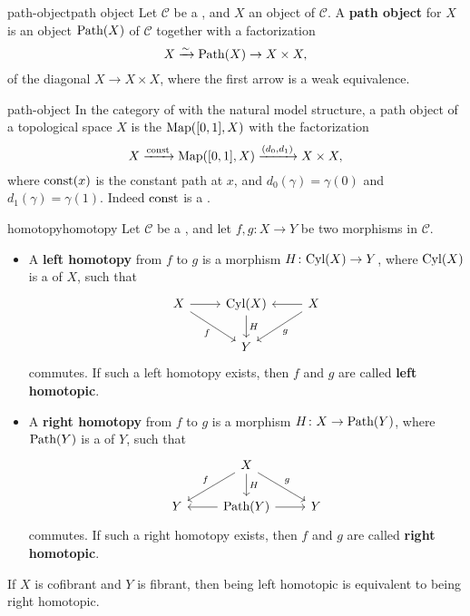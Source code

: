 \begin{topic}{path-object}{path object}
    Let $\mathcal{C}$ be a , and $X$ an object of $\mathcal{C}$. A \textbf{path object} for $X$ is an object $\textup{Path}(X)$ of $\mathcal{C}$ together with a factorization
    \[ X \xrightarrow{\sim} \textup{Path}(X) \to X \times X , \]
    of the diagonal $X \to X \times X$, where the first arrow is a weak equivalence.
\end{topic}

\begin{example}{path-object}
    In the category of  with the natural model structure, a path object of a topological space $X$ is the  $\textup{Map}([0, 1], X)$ with the factorization
    \[ X \xrightarrow{\textup{const}} \textup{Map}([0, 1], X) \xrightarrow{(d_0, d_1)} X \times X , \]
    where $\textup{const}(x)$ is the constant path at $x$, and $d_0(\gamma) = \gamma(0)$ and $d_1(\gamma) = \gamma(1)$. Indeed $\textup{const}$ is a .
\end{example}

\begin{topic}{homotopy}{homotopy}
    Let $\mathcal{C}$ be a , and let $f, g \colon X \to Y$ be two morphisms in $\mathcal{C}$.
    \begin{itemize}
        \item A \textbf{left homotopy} from $f$ to $g$ is a morphism $H \colon \textup{Cyl}(X) \to Y$, where $\textup{Cyl}(X)$ is a  of $X$, such that
        \[ \svg \begin{tikzcd} X \arrow{r} \arrow[swap]{dr}{f} & \textup{Cyl}(X) \arrow{d}{H} & X \arrow{l} \arrow{ld}{g} \\ & Y & \end{tikzcd} \]
        commutes. If such a left homotopy exists, then $f$ and $g$ are called \textbf{left homotopic}.
        \item A \textbf{right homotopy} from $f$ to $g$ is a morphism $H \colon X \to \textup{Path}(Y)$, where $\textup{Path}(Y)$ is a  of $Y$, such that
        \[ \svg \begin{tikzcd} & X \arrow{d}{H} \arrow[swap]{dl}{f} \arrow{dr}{g} & \\ Y & \textup{Path}(Y) \arrow{l} \arrow{r} & Y \end{tikzcd} \]
        commutes. If such a right homotopy exists, then $f$ and $g$ are called \textbf{right homotopic}.
    \end{itemize}
    If $X$ is cofibrant and $Y$ is fibrant, then being left homotopic is equivalent to being right homotopic.
\end{topic}
